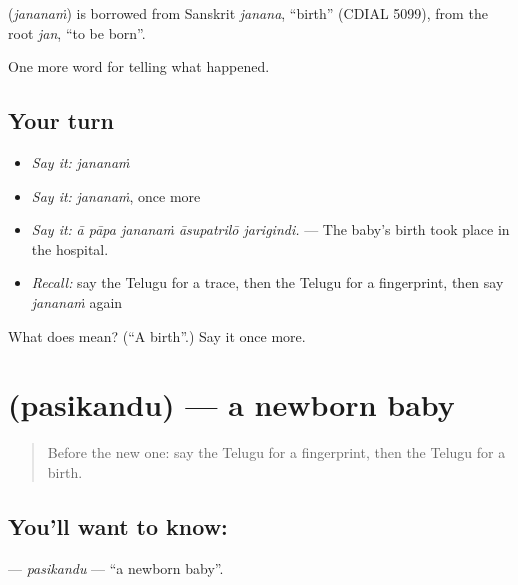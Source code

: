 \begin{cousinweb}
\textbf{} (\emph{jananaṁ}) is borrowed from Sanskrit \emph{janana}, \textquotedblleft{}birth\textquotedblright{} (CDIAL 5099), from the root \emph{jan}, \textquotedblleft{}to be born\textquotedblright{}.
\end{cousinweb}

\begin{grammarlens}[title={What you've built}]
One more word for telling what happened.
\end{grammarlens}

\subsection*{Your turn}
\begin{itemize}
\raggedright
  \item \emph{Say it:} \emph{jananaṁ}
  \item \emph{Say it:} \emph{jananaṁ}, once more
  \item \emph{Say it:} \emph{ā pāpa jananaṁ āsupatrilō jarigindi.} — The baby's birth took place in the hospital.
  \item \emph{Recall:} say the Telugu for a trace, then the Telugu for a fingerprint, then say \emph{jananaṁ} again
\end{itemize}

\begin{tcolorbox}[breakable,colback=teal!4,colframe=teal!35!black,title={Before you move on}]
What does  mean? (\textquotedblleft{}A birth\textquotedblright{}.) Say it once more.
\end{tcolorbox}
\section[\texorpdfstring{\te{పసికందు} (pasikandu)}{పసికందు (pasikandu)}]{ (pasikandu) — a newborn baby}

\label{lesson:TE-C334-pasikandu}



\begin{quote}
Before the new one: say the Telugu for a fingerprint, then the Telugu for a birth.
\end{quote}

\subsection*{You'll want to know: }
\textbf{} — \emph{pasikandu} — \textquotedblleft{}a newborn baby\textquotedblright{}.

